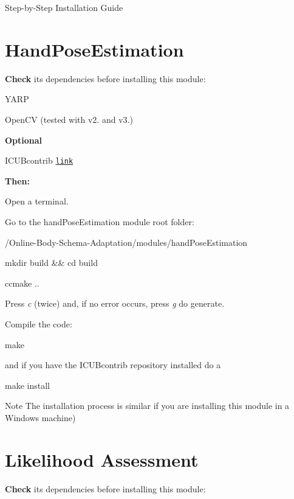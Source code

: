 Step-\/by-\/\+Step Installation Guide\hypertarget{installation_handpose_sec}{}\section{Hand\+Pose\+Estimation}\label{installation_handpose_sec}
{\bfseries Check} its dependencies before installing this module\+:


\begin{DoxyItemize}
\item Y\+A\+RP
\item Open\+CV (tested with v2. and v3.)
\end{DoxyItemize}

{\bfseries Optional} 
\begin{DoxyItemize}
\item I\+C\+U\+Bcontrib \href{https://github.com/robotology/icub-contrib-common}{\tt link}
\end{DoxyItemize}

{\bfseries Then\+:} 

Open a terminal.

Go to the hand\+Pose\+Estimation module root folder\+:


\begin{DoxyItemize}
\item /\+Online-\/\+Body-\/\+Schema-\/\+Adaptation/modules/hand\+Pose\+Estimation
\end{DoxyItemize}


\begin{DoxyCode}
mkdir build && cd build 
\end{DoxyCode}



\begin{DoxyCode}
ccmake .. 
\end{DoxyCode}


Press {\itshape c} (twice) and, if no error occurs, press {\itshape g} do generate.

Compile the code\+: 
\begin{DoxyCode}
make 
\end{DoxyCode}
 and if you have the I\+C\+U\+Bcontrib repository installed do a 
\begin{DoxyCode}
make install 
\end{DoxyCode}


\begin{DoxyNote}{Note}
The installation process is similar if you are installing this module in a Windows machine)
\end{DoxyNote}
\hypertarget{installation_likelihood_sec}{}\section{Likelihood Assessment}\label{installation_likelihood_sec}
{\bfseries Check} its dependencies before installing this module\+:


